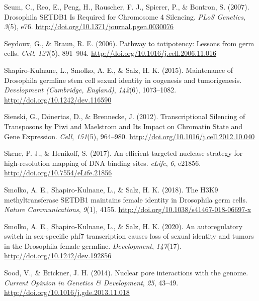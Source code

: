 \documentclass[12pt,oneside]{reedthesis}
\begin{document}
\leavevmode\hypertarget{ref-seumDrosophilaSETDB1Required2007}{}%
Seum, C., Reo, E., Peng, H., Rauscher, F. J., Spierer, P., \& Bontron, S. (2007). Drosophila SETDB1 Is Required for Chromosome 4 Silencing. \emph{PLoS Genetics}, \emph{3}(5), e76. \url{http://doi.org/10.1371/journal.pgen.0030076}

\leavevmode\hypertarget{ref-seydouxPathwayTotipotencyLessons2006}{}%
Seydoux, G., \& Braun, R. E. (2006). Pathway to totipotency: Lessons from germ cells. \emph{Cell}, \emph{127}(5), 891--904. \url{http://doi.org/10.1016/j.cell.2006.11.016}

\leavevmode\hypertarget{ref-shapiro-kulnaneMaintenanceDrosophilaGermline2015}{}%
Shapiro-Kulnane, L., Smolko, A. E., \& Salz, H. K. (2015). Maintenance of Drosophila germline stem cell sexual identity in oogenesis and tumorigenesis. \emph{Development (Cambridge, England)}, \emph{142}(6), 1073--1082. \url{http://doi.org/10.1242/dev.116590}

\leavevmode\hypertarget{ref-sienskiTranscriptionalSilencingTransposons2012}{}%
Sienski, G., Dönertas, D., \& Brennecke, J. (2012). Transcriptional Silencing of Transposons by Piwi and Maelstrom and Its Impact on Chromatin State and Gene Expression. \emph{Cell}, \emph{151}(5), 964--980. \url{http://doi.org/10.1016/j.cell.2012.10.040}

\leavevmode\hypertarget{ref-skeneEfficientTargetedNuclease2017}{}%
Skene, P. J., \& Henikoff, S. (2017). An efficient targeted nuclease strategy for high-resolution mapping of DNA binding sites. \emph{eLife}, \emph{6}, e21856. \url{http://doi.org/10.7554/eLife.21856}

\leavevmode\hypertarget{ref-smolkoH3K9MethyltransferaseSETDB12018}{}%
Smolko, A. E., Shapiro-Kulnane, L., \& Salz, H. K. (2018). The H3K9 methyltransferase SETDB1 maintains female identity in Drosophila germ cells. \emph{Nature Communications}, \emph{9}(1), 4155. \url{http://doi.org/10.1038/s41467-018-06697-x}

\leavevmode\hypertarget{ref-smolkoAutoregulatorySwitchSexspecific2020}{}%
Smolko, A. E., Shapiro-Kulnane, L., \& Salz, H. K. (2020). An autoregulatory switch in sex-specific phf7 transcription causes loss of sexual identity and tumors in the Drosophila female germline. \emph{Development}, \emph{147}(17). \url{http://doi.org/10.1242/dev.192856}

\leavevmode\hypertarget{ref-soodNuclearPoreInteractions2014}{}%
Sood, V., \& Brickner, J. H. (2014). Nuclear pore interactions with the genome. \emph{Current Opinion in Genetics \& Development}, \emph{25}, 43--49. \url{http://doi.org/10.1016/j.gde.2013.11.018}
\end{document}
